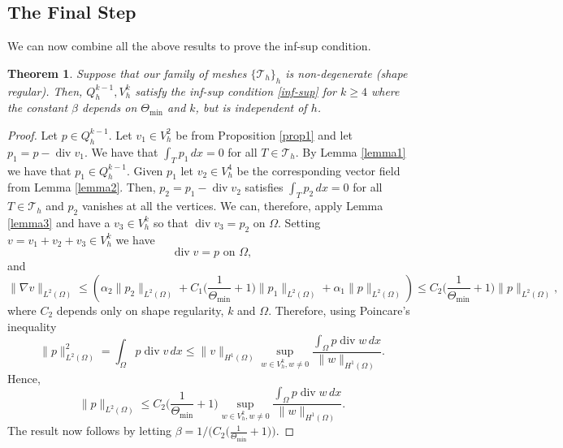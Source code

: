 \documentclass[11pt]{amsart}
\numberwithin{equation}{section}
\newcommand{\tmin}{\Theta_{\min}}
\newcommand{\dive}{\operatorname{div}}
\newcommand{\Th}{\mathcal{T}_h}
\newtheorem{theorem}{Theorem}
\theoremstyle{definition}
\begin{document}
 
\subsection{ The Final Step}
We can now combine all the above results to prove the inf-sup condition. 
\begin{theorem}\label{mainthm4}
Suppose that our family of meshes $\{\Th\}_h$  is non-degenerate (shape regular). 
Then,  $Q_h^{k-1}, V_h^k $ satisfy the inf-sup condition \eqref{inf-sup} for $k \ge 4$ where the constant $\beta$ depends on $\tmin$ and $k$, but is independent of $h$. 
\end{theorem}

\begin{proof}
Let $p \in Q_h^{k-1}$. Let $v_1 \in V_h^2$ be from Proposition \ref{prop1} and let $p_1=p-\dive v_1$.   We have that $\int_T p_1 \, dx =0 $ for all $T \in \Th$. By Lemma \ref{lemma1} we have that $p_1 \in Q_h^{k-1}$.  Given $p_1$  let $v_2 \in V_h^4$   be the corresponding vector field from Lemma \ref{lemma2}. Then,  $p_2= p_1-\dive v_2$ satisfies $\int_{T} p_2 \, dx =0 $ for all  $T \in \Th$ and $p_2$ vanishes at all the vertices.  We can, therefore, apply Lemma \ref{lemma3} and have a $v_3 \in V_h^k$ so that $\dive v_3= p_2$ on $\Omega$. Setting $v=v_1+v_2 +v_3 \in V_h^k$ we have
\begin{equation*}
\dive v= p  \text{ on } \Omega,
\end{equation*}
and
\begin{equation*}
\|\nabla v\|_{L^2(\Omega)} \le  (\alpha_2 \|p_2\|_{L^2(\Omega)} + C_1\Big( \frac{1}{\tmin}+1\Big)\|p_1\|_{L^2(\Omega)} + \alpha_1 \|p\|_{L^2(\Omega)}) \le C_2\Big( \frac{1}{\tmin}+1\Big) \|p\|_{L^2(\Omega)},
\end{equation*}
where $C_2$  depends only on shape regularity, $k$ and $\Omega$. Therefore, using Poincare's inequality
\begin{equation*}
\|p\|_{L^2(\Omega)}^2= \int_{\Omega} p \dive v \, dx \le   \|v\|_{H^1(\Omega)} \sup_{ w \in V_h^k, w \neq 0}  \frac{\int_{\Omega} p \dive w \, dx } { \|w \|_{H^1(\Omega)}}.  
\end{equation*}
Hence, 
\begin{equation*}
\|p\|_{L^2(\Omega)} \le  C_2\Big( \frac{1}{\tmin}+1\Big) \sup_{ w \in V_h^k, w \neq 0}  \frac{\int_{\Omega} p \dive w \, dx } { \|w \|_{H^1(\Omega)}}.  
\end{equation*}
The result now follows by letting $\beta =1/\big(C_2 \big(\frac{1}{\tmin}+1\big)\big) $.
\end{proof}
\end{document}
